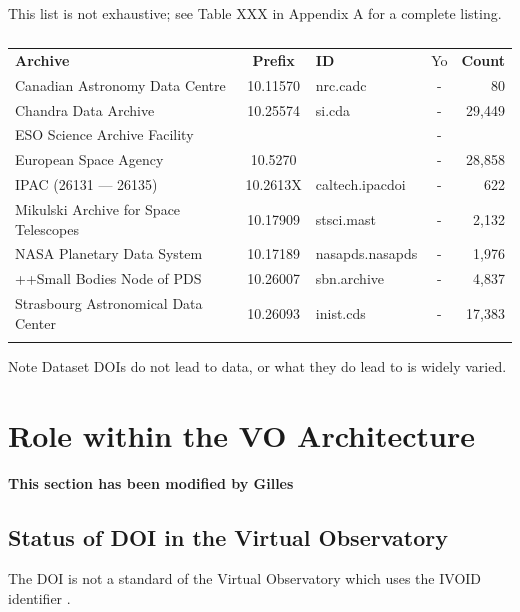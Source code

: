 \documentclass[11pt,a4paper]{ivoa}
\begin{document}
This list is not exhaustive; see Table XXX in Appendix A for a complete listing. 

\begin{table}[th]
\begin{tabular}{lclcr}
\sptablerule
\textbf{Archive} & \textbf{Prefix} & \textbf{ID} & Yo & \textbf{Count} \\
\sptablerule
Canadian Astronomy Data Centre        & 10.11570 & nrc.cadc        & - &     80   \\
Chandra Data Archive                  & 10.25574 & si.cda          & - & 29,449   \\
ESO Science Archive Facility          &          &                 & - &          \\
European Space Agency                 & 10.5270  &                 & - & 28,858   \\
IPAC (26131 --- 26135)                & 10.2613X & caltech.ipacdoi & - &    622   \\
Mikulski Archive for Space Telescopes & 10.17909 & stsci.mast      & - &  2,132   \\
NASA Planetary Data System            & 10.17189 & nasapds.nasapds & - &  1,976   \\
++Small Bodies Node of PDS            & 10.26007 & sbn.archive     & - &  4,837   \\
Strasbourg Astronomical Data Center   & 10.26093 & inist.cds       & - & 17,383   \\
\sptablerule
\end{tabular}%
\caption{\label{tab:astroDOIs1}}
\end{table}


\begin{admonition}{Note}
Dataset DOIs do not lead to data, or what they do lead to is widely varied.
\end{admonition}

\section{Role within the VO Architecture}
\textbf{\color{red}This section has been modified by Gilles}

\subsection{Status of DOI in the Virtual Observatory}
The DOI is not a standard of the Virtual Observatory which uses the IVOID identifier \citep{note:ivoid}.
\end{document}
